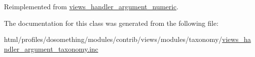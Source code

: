Reimplemented from \hyperlink{classviews__handler__argument__numeric_a480758dbcde899b5483b091e51e2bf39}{views\_\-handler\_\-argument\_\-numeric}.

The documentation for this class was generated from the following file:\begin{DoxyCompactItemize}
\item 
html/profiles/dosomething/modules/contrib/views/modules/taxonomy/\hyperlink{views__handler__argument__taxonomy_8inc}{views\_\-handler\_\-argument\_\-taxonomy.inc}\end{DoxyCompactItemize}
